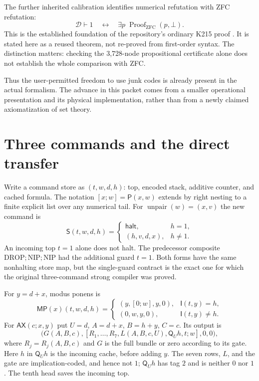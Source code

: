 \documentclass[11pt]{article}
\newcommand{\pair}{\mathsf P}
\newcommand{\imp}{\mathsf I}
\newcommand{\quant}{\mathsf Q}
\newcommand{\AX}{\mathsf{AX}}
\newcommand{\MP}{\mathsf{MP}}
\newcommand{\Tr}{\mathsf S}
\newcommand{\calD}{\mathcal D}
\begin{document}
The further inherited calibration identifies numerical refutation with
ZFC refutation:
\begin{equation}
 \calD\vdash1
 \quad\longleftrightarrow\quad
 \exists p\;\operatorname{Proof}_{\mathrm{ZFC}}(p,\bot).
 \label{eq:calibration}
\end{equation}
This is the established foundation of the repository's ordinary K215
proof \cite{k215,dominated}. It is stated here as a reused theorem,
not re-proved from first-order syntax. The distinction matters:
checking the 3,728-node propositional certificate alone does not
establish the whole comparison with ZFC.

Thus the user-permitted freedom to use junk codes is already present
in the actual formalism. The advance in this packet comes from a
smaller operational presentation and its physical implementation,
rather than from a newly claimed axiomatization of set theory.

\section{Three commands and the direct transfer}
\label{sec:commands}

Write a command store as $(t,w,d,h)$: top, encoded stack, additive
counter, and cached formula. The notation $[x;w]=\pair(x,w)$ extends
by right nesting to a finite explicit list over any numerical tail.
For $\operatorname{unpair}(w)=(x,v)$ the new command is
\begin{equation}
 \Tr(t,w,d,h)=
 \begin{cases}
 \mathsf{halt},&h=1,\\
 (h,v,d,x),&h\ne1.
 \end{cases}
 \label{eq:directS}
\end{equation}
An incoming top $t=1$ alone does not halt. The predecessor composite
$\mathrm{DROP};\mathrm{NIP};\mathrm{NIP}$ had the additional guard
$t=1$. Both forms have the same nonhalting store map, but the
single-guard contract is the exact one for which the original
three-command strong compiler was proved.

For $y=d+x$, modus ponens is
\[
 \MP(x)(t,w,d,h)=
 \begin{cases}
 (y,[0;w],y,0),&\imp(t,y)=h,\\
 (0,w,y,0),&\imp(t,y)\ne h.
 \end{cases}
\]
For $\AX(c;x,y)$ put $U=d$, $A=d+x$, $B=h+y$, $C=c$. Its output is
\begin{equation}
 \bigl(G(A,B,c),[R_1,\ldots,R_7,L(A,B,c,U),\quant_Uh,t;w],0,0\bigr),
 \label{eq:AX}
\end{equation}
where $R_j=R_j(A,B,c)$ and $G$ is the full bundle or zero according
to its gate. Here $h$ in $\quant_Uh$ is the incoming cache, before
adding $y$. The seven rows, $L$, and the gate are implication-coded,
and hence not $1$; $\quant_Uh$ has tag $2$ and is neither $0$ nor $1$.
The tenth head saves the incoming top.
\end{document}
